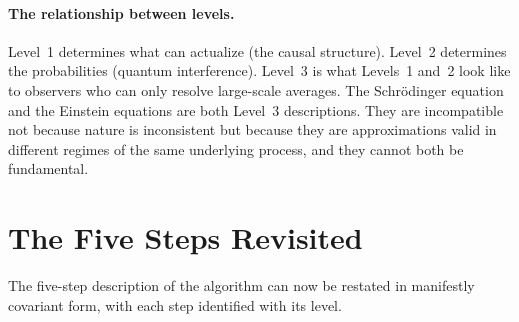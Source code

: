 \documentclass[11pt,a4paper]{article}
\theoremstyle{plain}
\theoremstyle{definition}
\theoremstyle{remark}
\begin{document}
\paragraph{The relationship between levels.}
Level~1 determines what can actualize (the causal structure). Level~2
determines the probabilities (quantum interference). Level~3 is what Levels~1
and~2 look like to observers who can only resolve large-scale averages. The
Schr\"{o}dinger equation and the Einstein equations are both Level~3
descriptions. They are incompatible not because nature is inconsistent but
because they are approximations valid in different regimes of the same
underlying process, and they cannot both be fundamental.

\section{The Five Steps Revisited}
\label{sec:fivesteps}

The five-step description of the algorithm can now be restated in manifestly
covariant form, with each step identified with its level.
\end{document}
